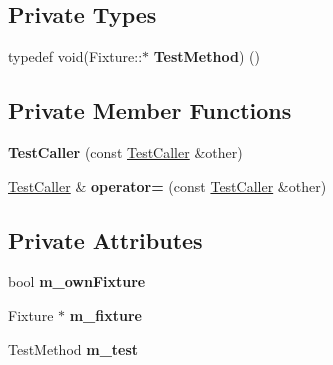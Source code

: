 \subsection*{Private Types}
\begin{DoxyCompactItemize}
\item 
typedef void(Fixture\+::$\ast$ {\bfseries Test\+Method}) ()\hypertarget{class_test_caller_a54b374d6624a3c1220bb494f0d92f4de}{}\label{class_test_caller_a54b374d6624a3c1220bb494f0d92f4de}

\end{DoxyCompactItemize}
\subsection*{Private Member Functions}
\begin{DoxyCompactItemize}
\item 
{\bfseries Test\+Caller} (const \hyperlink{class_test_caller}{Test\+Caller} \&other)\hypertarget{class_test_caller_aec48107c41433e781df1e6b5080edc22}{}\label{class_test_caller_aec48107c41433e781df1e6b5080edc22}

\item 
\hyperlink{class_test_caller}{Test\+Caller} \& {\bfseries operator=} (const \hyperlink{class_test_caller}{Test\+Caller} \&other)\hypertarget{class_test_caller_a6b2e444e49eb8dd4610eaa6313a4232c}{}\label{class_test_caller_a6b2e444e49eb8dd4610eaa6313a4232c}

\end{DoxyCompactItemize}
\subsection*{Private Attributes}
\begin{DoxyCompactItemize}
\item 
bool {\bfseries m\+\_\+own\+Fixture}\hypertarget{class_test_caller_a852c12b33c31d192c0554f775476de14}{}\label{class_test_caller_a852c12b33c31d192c0554f775476de14}

\item 
Fixture $\ast$ {\bfseries m\+\_\+fixture}\hypertarget{class_test_caller_a57c18e238fa4b4ef3d81bc7d62299674}{}\label{class_test_caller_a57c18e238fa4b4ef3d81bc7d62299674}

\item 
Test\+Method {\bfseries m\+\_\+test}\hypertarget{class_test_caller_a877a4ebaf671ec9d94954830bf5d27ef}{}\label{class_test_caller_a877a4ebaf671ec9d94954830bf5d27ef}

\end{DoxyCompactItemize}
